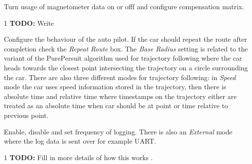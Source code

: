 \documentclass[12pt]{article} %
\def\printtodos{0}
\newcommand{\todo}[1]{
  \if\printtodos1
      {\color{red} \textbf{TODO:} #1}
  \fi}
\begin{document}
\begin{minipage}{0.7\textwidth} %
 Turn usage of magnetometer data on or
offf and configure compensation matrix.

 \todo{ Write }

 Configure the behaviour of the auto
pilot. If the car should repeat the route after completion check the
{\em Repeat Route} box. The {\em Base Radius} setting is related to
the variant of the PurePersuit algorithm used for trajectory following
where the car heads towards the closest point intersecting the
trajectory on a circle surrounding the car. There are also three
different modes for trajectory following: in {\em Speed} mode the car
uses speed information stored in the trajectory, then there is
absolute time and relative time where timestamps on the trajectory
either are treated as an absolute time when car should be at point or
time relative to previous point.

 Enable, disable and set frequency of logging. There is
also an {\em External} mode where the log data is sent over for example UART.
\todo{Fill in more details of how this works}.
\end{minipage}

\end{document}
